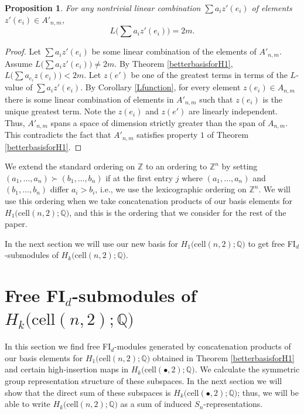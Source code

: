 \documentclass[12py]{amsart}%
\newtheorem{prop}[thm]{Proposition}
\theoremstyle{definition}\newtheorem{definition}[thm]{Definition}
\theoremstyle{definition}
\newcommand{\Z}{\ensuremath{\mathbb{Z}}}
\newcommand{\Q}{\ensuremath{\mathbb{Q}}}
\begin{document}
\begin{prop}\label{Lfunction2}
For any nontrivial linear combination $\sum a_{i}z'(e_{i})$ of elements $z'(e_{i})\in A'_{n,m}$, 
\[
L\Big(\sum a_{i}z'(e_{i})\Big)=2m.
\]
\end{prop}

\begin{proof}
Let $\sum a_{i}z'(e_{i})$ be some linear combination of the elements of $A'_{n,m}$. Assume $L\big(\sum a_{i}z'(e_{i})\big)\neq 2m$. By Theorem \ref{betterbasisforH1}, $L\big(\sum a_{e_{i}}z(e_{i})\big)<2m$. Let $z(e')$ be one of the greatest terms in terms of the $L$-value of $\sum a_{i}z'(e_{i})$. By Corollary \ref{Lfunction}, for every element $z(e_{i})\in A_{n,m}$ there is some linear combination of elements in $A'_{n,m}$ such that $z(e_{i})$ is the unique greatest term. Note the $z(e_{i})$ and $z(e')$ are linearly independent. Thus, $A'_{n,m}$ spans a space of dimension strictly greater than the span of $A_{n,m}$. This contradicts the fact that $A'_{n,m}$ satisfies property $1$ of Theorem \ref{betterbasisforH1}. 
\end{proof}

We extend the standard ordering on $\Z$ to an ordering to $\Z^{n}$ by setting $(a_{1},\dots, a_{n})\succ (b_{1},\dots, b_{n})$ if at the first entry $j$ where $(a_{1},\dots, a_{n})$ and $(b_{1},\dots, b_{n})$ differ $a_{i}> b_{i}$, i.e., we use the lexicographic ordering on $\Z^{n}$. We will use this ordering when we take concatenation products of our basis elements for $H_{1}\big(\text{cell}(n,2);\Q\big)$, and this is the ordering that we consider for the rest of the paper.

In the next section we will use our new basis for $H_{1}\big(\text{cell}(n,2);\Q\big)$ to get free FI$_{d}$-submodules of $H_{k}\big(\text{cell}(n,2);\Q\big)$.

\section{Free FI$_{d}$-submodules of $H_{k}\big(\text{cell}(n,2);\Q\big)$} \label{newHnbasis} 

In this section we find free FI$_{d}$-modules generated by concatenation products of our basis elements for $H_{1}\big(\text{cell}(n,2);\Q\big)$ obtained in Theorem \ref{betterbasisforH1} and certain high-insertion maps in $H_{k}\big(\text{cell}(\bullet,2);\Q\big)$. We calculate the symmetric group representation structure of these subspaces. In the next section we will show that the direct sum of these subspaces is $H_{k}\big(\text{cell}(\bullet,2);\Q\big)$; thus, we will be able to write $H_{k}\big(\text{cell}(n,2);\Q\big)$ as a sum of induced $S_{n}$-representations.
\end{document}
